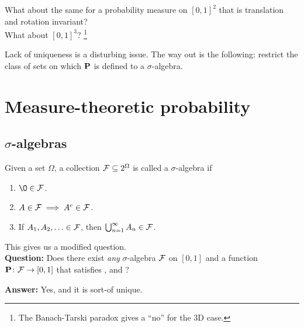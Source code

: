 What about the same for a probability measure on $[0, 1]^2$ that is
translation and rotation invariant? \\
What about $[0, 1]^3$?%
\footnote{The Banach-Tarski paradox gives a ``no'' for the 3D case.}

Lack of uniqueness is a disturbing issue.
The way out is the following: restrict the class of sets on which $\P$ is
defined to a $\sigma$-algebra.

\chapter{Measure-theoretic probability} \label{chp:measure}

\section{$\sigma$-algebras} \label{sec:sigma}
\begin{definition*} \label{def:sigma}
    Given a set $\Omega$, a collection $\F \subseteq 2^\Omega$ is called a
    $\sigma$-algebra if
    \begin{enumerate}
        \item $\O \in \F$. \label{def:sigma:o}
        \item $A \in \F \implies A^c \in \F$. \label{def:sigma:c}
        \item If $A_1, A_2, \ldots \in \F$, then
            $\bigcup_{n=1}^\infty A_n \in \F$. \label{def:sigma:u}
    \end{enumerate}
\end{definition*}

This gives us a modified question. \\
\textbf{Question:} Does there exist \emph{any} $\sigma$-algebra $\F$ on
$[0, 1]$ and a function $\P\colon \F \to [0, 1]$ that satisfies
, 
and ?%

\textbf{Answer:} Yes, and it is sort-of unique.

